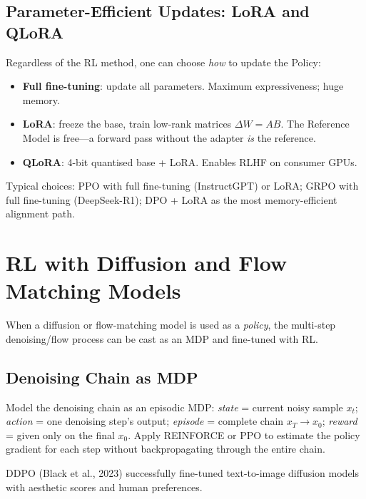 \subsection{Parameter-Efficient Updates: LoRA and QLoRA}

Regardless of the RL method, one can choose \emph{how} to update the Policy:

\begin{itemize}
  \item \textbf{Full fine-tuning}: update all parameters. Maximum expressiveness; huge memory.
  \item \textbf{LoRA}: freeze the base, train low-rank matrices $\Delta W = AB$. The Reference Model is free---a forward pass without the adapter \emph{is} the reference.
  \item \textbf{QLoRA}: 4-bit quantised base + LoRA. Enables RLHF on consumer GPUs.
\end{itemize}

Typical choices: PPO with full fine-tuning (InstructGPT) or LoRA; GRPO with full fine-tuning (DeepSeek-R1); DPO + LoRA as the most memory-efficient alignment path.

\section{RL with Diffusion and Flow Matching Models}
\label{sec:diffusion-rl}

When a diffusion or flow-matching model is used as a \emph{policy}, the multi-step denoising/flow process can be cast as an MDP and fine-tuned with RL.

\subsection{Denoising Chain as MDP}

\begin{keyidea}
Model the denoising chain as an episodic MDP:
\emph{state} = current noisy sample $x_t$;
\emph{action} = one denoising step's output;
\emph{episode} = complete chain $x_T \to x_0$;
\emph{reward} = given only on the final $x_0$.
Apply REINFORCE or PPO to estimate the policy gradient for each step without backpropagating through the entire chain.
\end{keyidea}

DDPO (Black et al., 2023) successfully fine-tuned text-to-image diffusion models with aesthetic scores and human preferences.


